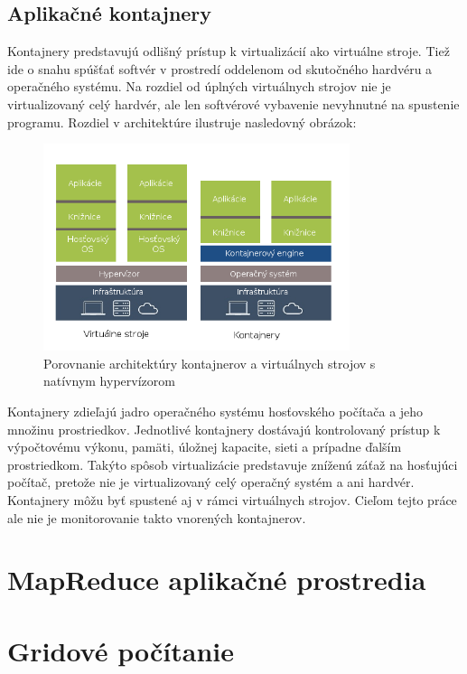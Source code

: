 \documentclass[printed,11pt,twoside,color,cover,table]{fithesis3}
\begin{document}
\subsection{Aplikačné kontajnery}
Kontajnery predstavujú odlišný prístup k virtualizácií ako virtuálne stroje. Tiež ide o snahu spúšťať softvér v prostredí oddelenom od skutočného hardvéru a operačného systému. Na rozdiel od úplných virtuálnych strojov 
nie je virtualizovaný celý hardvér, ale len softvérové vybavenie nevyhnutné na spustenie programu. Rozdiel v architektúre ilustruje nasledovný obrázok: 
\begin{figure}[h]
\begin{center}
       \includegraphics[width=0.8\textwidth]{images/kontajnery-virtualky.png}
       \caption{Porovnanie architektúry kontajnerov a virtuálnych strojov s natívnym hypervízorom}
\end{center}
\end{figure}
Kontajnery zdieľajú jadro operačného systému hosťovského počítača a jeho množinu prostriedkov. Jednotlivé kontajnery dostávajú kontrolovaný prístup k výpočtovému výkonu, pamäti, úložnej kapacite, 
sieti a prípadne ďalším prostriedkom. Takýto spôsob virtualizácie predstavuje zníženú záťaž na hosťujúci počítač, pretože nie je virtualizovaný celý operačný systém a ani hardvér.
\\Kontajnery môžu byť spustené aj v rámci virtuálnych strojov. Cieľom tejto práce ale nie je monitorovanie takto vnorených kontajnerov.

\section{MapReduce aplikačné prostredia}

\section{Gridové počítanie}
\end{document}
